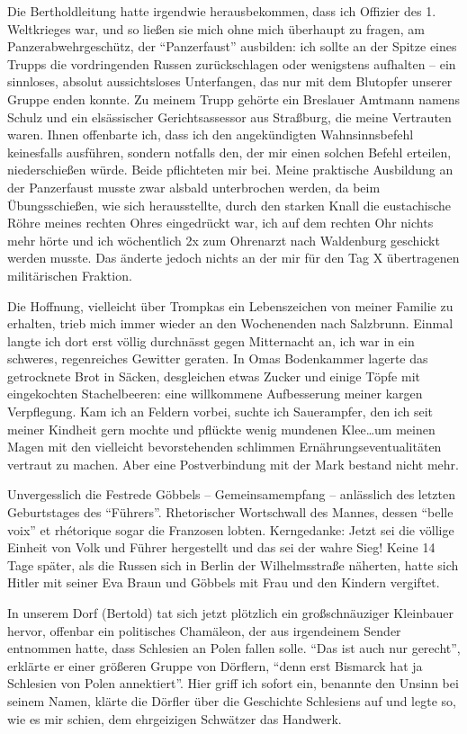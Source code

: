 Die Bertholdleitung hatte irgendwie herausbekommen, dass ich Offizier des 1. Weltkrieges war, und so ließen sie mich ohne mich überhaupt zu fragen, am Panzerabwehrgeschütz, der \enquote{Panzerfaust} ausbilden: ich sollte an der Spitze eines Trupps die vordringenden Russen zurückschlagen oder wenigstens aufhalten -- ein sinnloses, absolut aussichtsloses Unterfangen, das nur mit dem Blutopfer unserer Gruppe enden konnte. Zu meinem Trupp gehörte ein Breslauer Amtmann namens Schulz und ein  elsässischer Gerichtsassessor aus Straßburg, die meine Vertrauten waren. Ihnen offenbarte ich, dass ich den angekündigten Wahnsinnsbefehl keinesfalls ausführen, sondern notfalls den, der mir einen solchen Befehl erteilen, niederschießen würde. Beide pflichteten mir bei. Meine praktische Ausbildung an der Panzerfaust musste zwar alsbald unterbrochen werden, da beim Übungsschießen, wie sich herausstellte, durch den starken Knall die eustachische Röhre meines rechten Ohres eingedrückt war, ich auf dem rechten Ohr nichts mehr hörte und ich wöchentlich 2x zum Ohrenarzt nach Waldenburg geschickt werden musste. Das änderte jedoch nichts an der mir für den Tag X übertragenen militärischen Fraktion.

Die Hoffnung, vielleicht über Trompkas ein Lebenszeichen von meiner Familie zu erhalten, trieb mich immer wieder an den Wochenenden nach Salzbrunn. Einmal langte ich dort erst völlig durchnässt gegen Mitternacht an, ich war in ein schweres, regenreiches Gewitter geraten. In Omas Bodenkammer lagerte das getrocknete Brot in Säcken, desgleichen etwas Zucker und einige Töpfe mit eingekochten Stachelbeeren: eine willkommene Aufbesserung meiner kargen Verpflegung. Kam ich an Feldern vorbei,  suchte ich Sauerampfer, den ich seit meiner Kindheit gern mochte und pflückte wenig mundenen Klee\dots um meinen Magen mit den vielleicht bevorstehenden schlimmen Ernährungseventualitäten vertraut zu machen. Aber eine Postverbindung mit der Mark bestand nicht mehr.

Unvergesslich die Festrede Göbbels -- Gemeinsamempfang -- anlässlich des letzten Geburtstages des \enquote{Führers}. Rhetorischer Wortschwall des Mannes, dessen \enquote{belle voix} et rhétorique sogar die Franzosen lobten. Kerngedanke: Jetzt sei die völlige Einheit von Volk und Führer hergestellt und das sei der wahre Sieg! Keine 14 Tage später, als die Russen sich in Berlin der Wilhelmsstraße näherten, hatte sich Hitler mit seiner Eva Braun und Göbbels mit Frau und den Kindern vergiftet.

In unserem Dorf (Bertold) tat sich jetzt plötzlich ein großschnäuziger Kleinbauer hervor, offenbar ein politisches Chamäleon, der aus irgendeinem Sender entnommen hatte, dass Schlesien an Polen fallen solle. \enquote{Das ist auch nur gerecht}, erklärte er einer größeren Gruppe von Dörflern, \enquote{denn erst Bismarck hat ja Schlesien von Polen annektiert}. Hier griff ich sofort ein, benannte den Unsinn bei seinem Namen, klärte die Dörfler über die Geschichte Schlesiens auf und legte so, wie es mir schien, dem ehrgeizigen Schwätzer das Handwerk.

